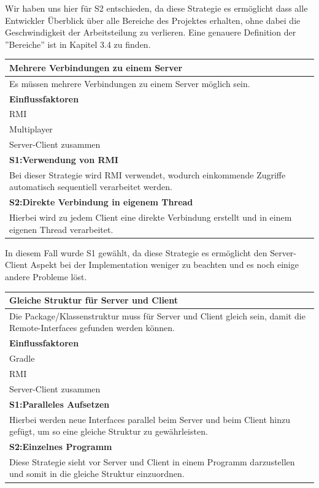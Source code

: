 \documentclass[fontsize=12pt,paper=a4,twoside]{scrartcl}
\begin{document}
Wir haben uns hier für S2 entschieden, da diese Strategie es ermöglicht dass alle Entwickler Überblick über alle Bereiche des Projektes erhalten, ohne dabei die Geschwindigkeit der Arbeitsteilung zu verlieren. Eine genauere Definition der ''Bereiche'' ist in Kapitel 3.4 zu finden.

\begin{tabular}{|p{15cm}|}
	\hline
	\bfseries{Mehrere Verbindungen zu einem Server}\\ \hline
	Es müssen mehrere Verbindungen zu einem Server möglich sein.\\ 
	\textbf{Einflussfaktoren}\\
	RMI\\ 
	Multiplayer\\ 
	Server-Client zusammen\\ \hline
	\textbf{S1:Verwendung von RMI}\\
	Bei dieser Strategie wird RMI verwendet, wodurch einkommende Zugriffe automatisch sequentiell verarbeitet werden.\\ \hline
	\textbf{S2:Direkte Verbindung in eigenem Thread}\\
	Hierbei wird zu jedem Client eine direkte Verbindung erstellt und in einem eigenen Thread verarbeitet.\\ \hline
\end{tabular} 

In diesem Fall wurde S1 gewählt, da diese Strategie es ermöglicht den Server-Client Aspekt bei der Implementation weniger zu beachten und es noch einige andere Probleme löst.

\begin{tabular}{|p{15cm}|}
	\hline
	\bfseries{Gleiche Struktur für Server und Client}\\ \hline
	Die Package/Klassenstruktur muss für Server und Client gleich sein, damit die Remote-Interfaces gefunden werden können.\\ 
	\textbf{Einflussfaktoren}\\
	Gradle\\ 
	RMI\\ 
	Server-Client zusammen\\ \hline
	\textbf{S1:Paralleles Aufsetzen}\\
	Hierbei werden neue Interfaces parallel beim Server und beim Client hinzu gefügt, um so eine gleiche Struktur zu gewährleisten.\\ \hline
	\textbf{S2:Einzelnes Programm}\\
	Diese Strategie sieht vor Server und Client in einem Programm darzustellen und somit in die gleiche Struktur einzuordnen.\\ \hline
\end{tabular} 
\end{document}
